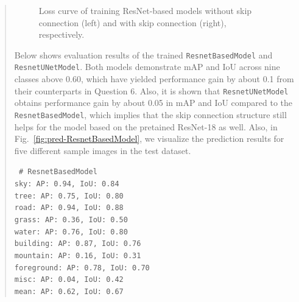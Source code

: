 \documentclass[9pt]{article}
\begin{document}
\begin{quote}
\begin{figure}[h]
    \centering
    \qquad
    \caption{Loss curve of training ResNet-based models without skip connection (left) and with skip connection (right), respectively.}
    \label{fig:loss-ResnetBasedModel}
\end{figure}

Below shows evaluation results of the trained \texttt{ResnetBasedModel} and \texttt{ResnetUNetModel}. Both models demonstrate mAP and IoU across nine classes above 0.60, which have yielded performance gain by about 0.1 from their counterparts in Question 6. Also, it is shown that \texttt{ResnetUNetModel} obtains performance gain by about 0.05 in mAP and IoU compared to the \texttt{ResnetBasedModel}, which implies that the skip connection structure still helps for the model based on the pretained ResNet-18 as well. Also, in Fig.~\ref{fig:pred-ResnetBasedModel}, we visualize the prediction results for five different sample images in the test dataset.

{\centering \tt \small
\# ResnetBasedModel \\
sky: AP: 0.94, IoU: 0.84 \\
tree: AP: 0.75, IoU: 0.80 \\
road: AP: 0.94, IoU: 0.88 \\
grass: AP: 0.36, IoU: 0.50 \\
water: AP: 0.76, IoU: 0.80 \\
building: AP: 0.87, IoU: 0.76 \\
mountain: AP: 0.16, IoU: 0.31 \\
foreground: AP: 0.78, IoU: 0.70 \\
misc: AP: 0.04, IoU: 0.42 \\
mean: AP: 0.62, IoU: 0.67 \\

}
\end{quote}
\end{document}
